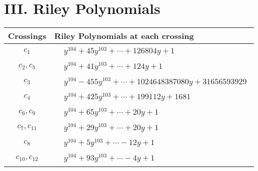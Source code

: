 \documentclass[1p]{elsarticle_modified}
\theoremstyle{definition}
\begin{document}
\centering \section*{ III. Riley Polynomials}
\begin{tabular}{m{50pt}|m{274pt}}
Crossings & \hspace{64pt}Riley Polynomials at each crossing \\
\hline $$\begin{aligned}c_{1}\end{aligned}$$&$\begin{aligned}
&y^{104}+45 y^{103}+\cdots+126804 y+1
\end{aligned}$\\
\hline $$\begin{aligned}c_{2},c_{5}\end{aligned}$$&$\begin{aligned}
&y^{104}+41 y^{103}+\cdots+124 y+1
\end{aligned}$\\
\hline $$\begin{aligned}c_{3}\end{aligned}$$&$\begin{aligned}
&y^{104}-455 y^{103}+\cdots+1024648387080 y+31656593929
\end{aligned}$\\
\hline $$\begin{aligned}c_{4}\end{aligned}$$&$\begin{aligned}
&y^{104}+425 y^{103}+\cdots+199112 y+1681
\end{aligned}$\\
\hline $$\begin{aligned}c_{6},c_{9}\end{aligned}$$&$\begin{aligned}
&y^{104}+65 y^{103}+\cdots+20 y+1
\end{aligned}$\\
\hline $$\begin{aligned}c_{7},c_{11}\end{aligned}$$&$\begin{aligned}
&y^{104}+29 y^{103}+\cdots+20 y+1
\end{aligned}$\\
\hline $$\begin{aligned}c_{8}\end{aligned}$$&$\begin{aligned}
&y^{104}+5 y^{103}+\cdots-12 y+1
\end{aligned}$\\
\hline $$\begin{aligned}c_{10},c_{12}\end{aligned}$$&$\begin{aligned}
&y^{104}+93 y^{103}+\cdots-4 y+1
\end{aligned}$\\
\hline
\end{tabular}
\vskip 2pc
\end{document}
